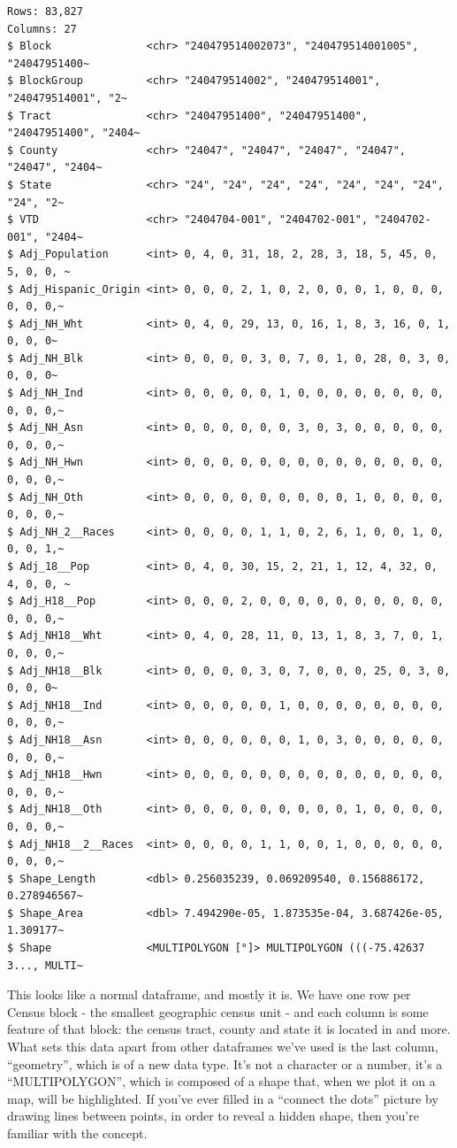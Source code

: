 \documentclass[
  letterpaper,
  DIV=11,
  numbers=noendperiod]{scrreprt}
\begin{document}
\begin{verbatim}
Rows: 83,827
Columns: 27
$ Block               <chr> "240479514002073", "240479514001005", "24047951400~
$ BlockGroup          <chr> "240479514002", "240479514001", "240479514001", "2~
$ Tract               <chr> "24047951400", "24047951400", "24047951400", "2404~
$ County              <chr> "24047", "24047", "24047", "24047", "24047", "2404~
$ State               <chr> "24", "24", "24", "24", "24", "24", "24", "24", "2~
$ VTD                 <chr> "2404704-001", "2404702-001", "2404702-001", "2404~
$ Adj_Population      <int> 0, 4, 0, 31, 18, 2, 28, 3, 18, 5, 45, 0, 5, 0, 0, ~
$ Adj_Hispanic_Origin <int> 0, 0, 0, 2, 1, 0, 2, 0, 0, 0, 1, 0, 0, 0, 0, 0, 0,~
$ Adj_NH_Wht          <int> 0, 4, 0, 29, 13, 0, 16, 1, 8, 3, 16, 0, 1, 0, 0, 0~
$ Adj_NH_Blk          <int> 0, 0, 0, 0, 3, 0, 7, 0, 1, 0, 28, 0, 3, 0, 0, 0, 0~
$ Adj_NH_Ind          <int> 0, 0, 0, 0, 0, 1, 0, 0, 0, 0, 0, 0, 0, 0, 0, 0, 0,~
$ Adj_NH_Asn          <int> 0, 0, 0, 0, 0, 0, 3, 0, 3, 0, 0, 0, 0, 0, 0, 0, 0,~
$ Adj_NH_Hwn          <int> 0, 0, 0, 0, 0, 0, 0, 0, 0, 0, 0, 0, 0, 0, 0, 0, 0,~
$ Adj_NH_Oth          <int> 0, 0, 0, 0, 0, 0, 0, 0, 0, 1, 0, 0, 0, 0, 0, 0, 0,~
$ Adj_NH_2__Races     <int> 0, 0, 0, 0, 1, 1, 0, 2, 6, 1, 0, 0, 1, 0, 0, 0, 1,~
$ Adj_18__Pop         <int> 0, 4, 0, 30, 15, 2, 21, 1, 12, 4, 32, 0, 4, 0, 0, ~
$ Adj_H18__Pop        <int> 0, 0, 0, 2, 0, 0, 0, 0, 0, 0, 0, 0, 0, 0, 0, 0, 0,~
$ Adj_NH18__Wht       <int> 0, 4, 0, 28, 11, 0, 13, 1, 8, 3, 7, 0, 1, 0, 0, 0,~
$ Adj_NH18__Blk       <int> 0, 0, 0, 0, 3, 0, 7, 0, 0, 0, 25, 0, 3, 0, 0, 0, 0~
$ Adj_NH18__Ind       <int> 0, 0, 0, 0, 0, 1, 0, 0, 0, 0, 0, 0, 0, 0, 0, 0, 0,~
$ Adj_NH18__Asn       <int> 0, 0, 0, 0, 0, 0, 1, 0, 3, 0, 0, 0, 0, 0, 0, 0, 0,~
$ Adj_NH18__Hwn       <int> 0, 0, 0, 0, 0, 0, 0, 0, 0, 0, 0, 0, 0, 0, 0, 0, 0,~
$ Adj_NH18__Oth       <int> 0, 0, 0, 0, 0, 0, 0, 0, 0, 1, 0, 0, 0, 0, 0, 0, 0,~
$ Adj_NH18__2__Races  <int> 0, 0, 0, 0, 1, 1, 0, 0, 1, 0, 0, 0, 0, 0, 0, 0, 0,~
$ Shape_Length        <dbl> 0.256035239, 0.069209540, 0.156886172, 0.278946567~
$ Shape_Area          <dbl> 7.494290e-05, 1.873535e-04, 3.687426e-05, 1.309177~
$ Shape               <MULTIPOLYGON [°]> MULTIPOLYGON (((-75.42637 3..., MULTI~
\end{verbatim}

This looks like a normal dataframe, and mostly it is. We have one row
per Census block - the smallest geographic census unit - and each column
is some feature of that block: the census tract, county and state it is
located in and more. What sets this data apart from other dataframes
we've used is the last column, ``geometry'', which is of a new data
type. It's not a character or a number, it's a ``MULTIPOLYGON'', which
is composed of a shape that, when we plot it on a map, will be
highlighted. If you've ever filled in a ``connect the dots'' picture by
drawing lines between points, in order to reveal a hidden shape, then
you're familiar with the concept.
\end{document}
